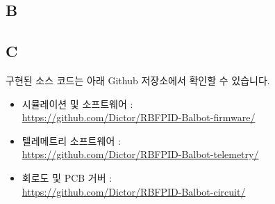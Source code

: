 \subsection*{B}
\label{appendix:gerber}
%
\begin{figure}[H]
\centering
{}
\end{figure}
%
\subsection*{C}
\label{appendix:source}
구현된 소스 코드는 아래 Github 저장소에서 확인할 수 있습니다.
\begin{itemize}
    \item 시뮬레이션 및 소프트웨어 : \\ \url{https://github.com/Dictor/RBFPID-Balbot-firmware/}
    \item 텔레메트리 소프트웨어 : \\ \url{https://github.com/Dictor/RBFPID-Balbot-telemetry/}
    \item 회로도 및 PCB 거버 : \\ \url{https://github.com/Dictor/RBFPID-Balbot-circuit/}
\end{itemize}
%